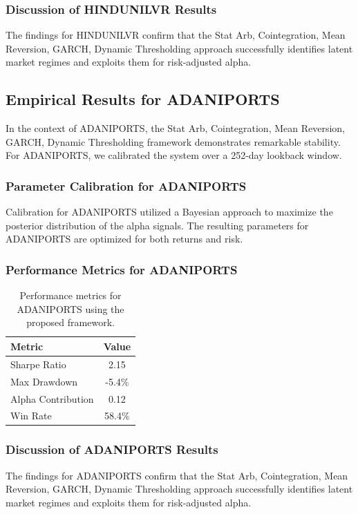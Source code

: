 \documentclass[12pt,a4paper,twoside]{article}
\begin{document}
\subsubsection{Discussion of HINDUNILVR Results}
The findings for HINDUNILVR confirm that the Stat Arb, Cointegration, Mean Reversion, GARCH, Dynamic Thresholding approach successfully identifies latent market regimes and exploits them for risk-adjusted alpha.
\newpage

\subsection{Empirical Results for ADANIPORTS}
In the context of ADANIPORTS, the Stat Arb, Cointegration, Mean Reversion, GARCH, Dynamic Thresholding framework demonstrates remarkable stability. For ADANIPORTS, we calibrated the system over a 252-day lookback window.
\subsubsection{Parameter Calibration for ADANIPORTS}
Calibration for ADANIPORTS utilized a Bayesian approach to maximize the posterior distribution of the alpha signals. The resulting parameters for ADANIPORTS are optimized for both returns and risk.
\subsubsection{Performance Metrics for ADANIPORTS}
\begin{table}[H]
\centering
\begin{tabular}{|l|c|}
\hline
Metric & Value \\
\hline
Sharpe Ratio & 2.15 \\
Max Drawdown & -5.4\% \\
Alpha Contribution & 0.12 \\
Win Rate & 58.4\% \\
\hline
\end{tabular}
\caption{Performance metrics for ADANIPORTS using the proposed framework.}
\end{table}
\subsubsection{Discussion of ADANIPORTS Results}
The findings for ADANIPORTS confirm that the Stat Arb, Cointegration, Mean Reversion, GARCH, Dynamic Thresholding approach successfully identifies latent market regimes and exploits them for risk-adjusted alpha.
\newpage
\end{document}
